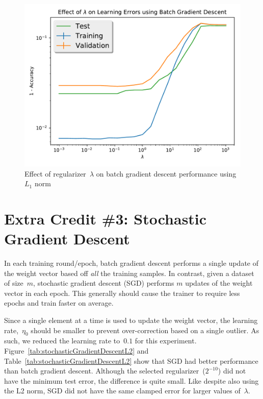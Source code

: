 \documentclass{report}
\begin{document}
  \begin{figure}
    \centering
    \includegraphics[scale=.5]{batch_GD_L1Norm}
    \caption{Effect of regularizer~$\lambda$ on batch gradient descent performance using $L_1$ norm}\label{fig:batchGdL1}
  \end{figure}

  \section{Extra Credit \#3: Stochastic Gradient Descent}
  
  In each training round/epoch, batch gradient descent performs a single update of the weight vector based off \textit{all} the training samples.  In contrast, given a dataset of size~$m$, stochastic gradient descent (SGD) performs $m$ updates of the weight vector in each epoch.  This generally should cause the trainer to require less epochs and train faster on average.
  
  Since a single element at a time is used to update the weight vector, the learning rate,~$\eta_{0}$ should be smaller to prevent over-correction based on a single outlier.  As such, we reduced the learning rate to~$0.1$ for this experiment.  Figure~\ref{tab:stochasticGradientDescentL2} and Table~\ref{tab:stochasticGradientDescentL2} show that SGD had better performance than batch gradient descent.  Although the selected regularizer~($2^{-10}$) did not have the minimum test error, the difference is quite small.  Like despite also using the L2 norm, SGD did not have the same clamped error for larger values of~$\lambda$.
  
\end{document}
